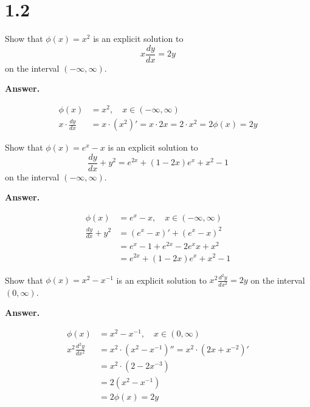 \documentclass[12pt]{article}
\newenvironment{Answer}{%
  \par\medskip\noindent
  \begin{list}{}{%
    \setlength{\leftmargin}{0pt}%
    \setlength{\itemindent}{0pt}%
    \setlength{\listparindent}{0pt}%
  }%
  \item\relax
  \textbf{Answer.}\quad\ignorespaces
}{%
  \end{list}
  \par\medskip
}
\begin{document}
\section*{1.2}
\begin{enumerate}[label=\textbf{\arabic*.(a)}, leftmargin=*]
  \item Show that $\phi(x)=x^{2}$ is an explicit solution to
  \[ \displaystyle x\frac{dy}{dx}=2y \]
  on the interval $(-\infty,\infty)$.
  \begin{Answer}
  \begin{align*}
    \phi(x) &= x^2, \quad x \in (-\infty, \infty) \\[0.3em]
    \displaystyle x \cdot \frac{dy}{dx} &= \displaystyle x \cdot (x^2)' = x \cdot 2x = 2 \cdot x^2 = 2\phi(x) = 2y
  \end{align*}
  \end{Answer}

  \item[(b)] Show that $\phi(x)=e^{x}-x$ is an explicit solution to
  \[ \displaystyle \frac{dy}{dx}+y^{2}=e^{2x}+(1-2x)e^{x}+x^{2}-1 \]
  on the interval $(-\infty,\infty)$.
  \begin{Answer}
  \begin{align*}
    \phi(x) &= e^x - x, \quad x \in (-\infty, \infty) \\[0.3em]
    \displaystyle \frac{dy}{dx} + y^2 &= (e^x - x)' + (e^x - x)^2 \\[0.3em]
    &= e^x - 1 + e^{2x} - 2e^x x + x^2 \\[0.3em]
    &= e^{2x} + (1-2x)e^x + x^2 - 1
  \end{align*}
  \end{Answer}

  \item[(c)] Show that $\phi(x)=x^{2}-x^{-1}$ is an explicit solution to $\displaystyle x^{2}\frac{d^{2}y}{dx^{2}}=2y$ on the interval $(0,\infty)$.
  \begin{Answer}
  \begin{align*}
    \phi(x) &= x^2 - x^{-1}, \quad x \in (0, \infty) \\[0.3em]
    \displaystyle x^2 \frac{d^2y}{dx^2} &= \displaystyle x^2 \cdot (x^2 - x^{-1})'' = x^2 \cdot (2x + x^{-2})' \\[0.3em]
    &= x^2 \cdot (2 - 2x^{-3}) \\[0.3em]
    &= 2(x^2 - x^{-1}) \\[0.3em]
    &= 2\phi(x) = 2y
  \end{align*}
  \end{Answer}
\end{enumerate}
\end{document}
